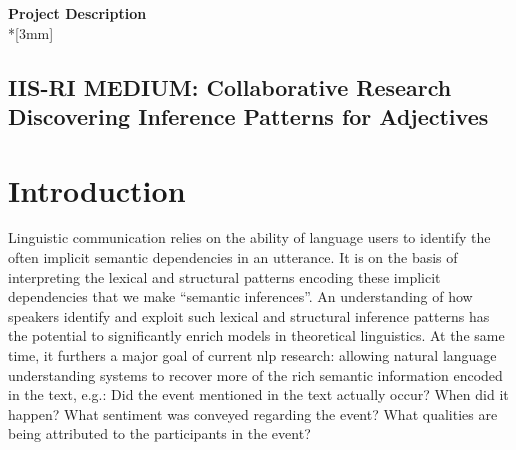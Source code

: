 \documentclass[10pt]{article}
\begin{document}
\begin{center}
{\LARGE{\bf Project Description}}\\*[3mm]
\vspace {-6mm}
 
\subsection*{IIS-RI MEDIUM: Collaborative Research\\
Discovering Inference Patterns for Adjectives}
\end{center}

\vspace {-2mm}

\section{\label{intro}Introduction}

\vspace {-3mm}
 
Linguistic communication relies on the ability of language users to identify the often implicit semantic dependencies in an utterance. It is on the basis of 
interpreting the lexical and structural  patterns encoding these implicit dependencies that we make ``semantic inferences''. An understanding of how speakers identify and exploit such lexical and structural inference patterns has the potential to significantly enrich models in theoretical linguistics. 
At the same time, it furthers a major goal of current {\sc nlp} research: allowing natural language understanding systems to recover more of the rich semantic information encoded in the text, e.g.: Did the event mentioned in the text actually occur? When did it happen? What sentiment was conveyed regarding the event? What qualities are being attributed to the participants in the event? 
 
\end{document}
